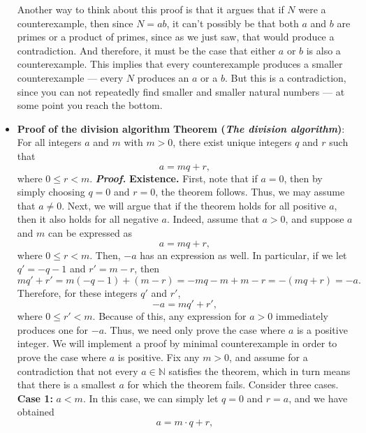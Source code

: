 \documentclass{report}
\begin{document}
\begin{itemize}
            \bigbreak \noindent 
            Another way to think about this proof is that it argues that if $N$ were a counterexample, then since $N = ab$, it can’t possibly be that both $a$ and $b$ are primes or a product of primes, since as we just saw, that would produce a contradiction. And therefore, it must be the case that either $a$ or $b$ is also a counterexample. This implies that every counterexample produces a smaller counterexample — every $N$ produces an $a$ or a $b$. But this is a contradiction, since you can not repeatedly find smaller and smaller natural numbers — at some point you reach the bottom.
        \item \textbf{Proof of the division algorithm}
            \bigbreak \noindent 
            \textbf{Theorem (\textit{The division algorithm})}: For all integers $a$ and $m$ with $m > 0$, there exist unique integers $q$ and $r$ such that
            \[
                a = mq + r,
            \]
            where $0 \leq r < m$.
            \bigbreak \noindent 
            \textbf{\textit{Proof.}} 
            \textbf{Existence.} First, note that if $a = 0$, then by simply choosing $q = 0$ and $r = 0$, the theorem follows. Thus, we may assume that $a \neq 0$.
            \bigbreak \noindent 
            Next, we will argue that if the theorem holds for all positive $a$, then it also holds for all negative $a$. Indeed, assume that $a > 0$, and suppose $a$ and $m$ can be expressed as
            \[
                a = mq + r,
            \]
            where $0 \leq r < m$. Then, $-a$ has an expression as well. In particular, if we let $q' = -q - 1$ and $r' = m - r$, then
            \[
                mq' + r' = m(-q - 1) + (m - r) = -mq - m + m - r = -(mq + r) = -a.
            \]
            Therefore, for these integers $q'$ and $r'$,
            \[
                -a = mq' + r',
            \]
            where $0 \leq r' < m$. Because of this, any expression for $a > 0$ immediately produces one for $-a$. Thus, we need only prove the case where $a$ is a positive integer.
            \bigbreak \noindent 
            We will implement a proof by minimal counterexample in order to prove the case where $a$ is positive. Fix any $m > 0$, and assume for a contradiction that not every $a \in \mathbb{N}$ satisfies the theorem, which in turn means that there is a smallest $a$ for which the theorem fails. Consider three cases.
            \bigbreak \noindent 
            \textbf{Case 1:} $a < m$. In this case, we can simply let $q = 0$ and $r = a$, and we have obtained
            \[
                a = m \cdot q + r,
\]
\end{itemize}
\end{document}
